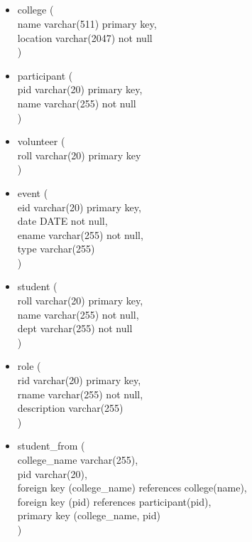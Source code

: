 \documentclass[7pt]{article}
\begin{document}
\subsection{}
\begin{itemize}
    \item college ( \\
    name varchar(511) primary key, \\
    location varchar(2047) not null \\
    )

    \item participant ( \\
    pid varchar(20) primary key, \\
    name varchar(255) not null \\
    )

    \item volunteer ( \\
    roll varchar(20) primary key\\
    )

    \item event ( \\
    eid varchar(20) primary key,    \\
    date DATE not null,     \\
    ename varchar(255) not null,    \\
    type varchar(255)   \\
    )

    \item student ( \\
    roll varchar(20) primary key,   \\
    name varchar(255) not null, \\
    dept varchar(255) not null \\
    )

\newpage

    \item role (    \\
    rid varchar(20) primary key,       \\
    rname varchar(255) not null,    \\
    description varchar(255)    \\
    )

    \item student\_from (  \\
    college\_name varchar(255),  \\
    pid varchar(20),    \\
    foreign key (college\_name) references college(name),    \\
    foreign key (pid) references participant(pid),  \\
    primary key (college\_name, pid)     \\
    )


\end{itemize}
\end{document}
